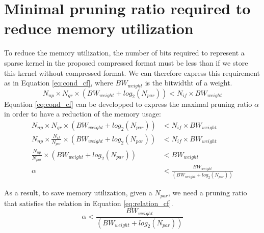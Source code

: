 \chapter{Minimal pruning ratio required to reduce memory utilization} \label{appendix:cf}
%
To reduce the memory utilization, the number of bits required to represent a sparse kernel in the proposed compressed format must be less than if we store this kernel without compressed format. We can therefore express this requirement as in Equation \eqref{eq:cond_cf}, where $BW_{weight}$ is the bitwidtht of a weight.
\begin{equation}
    N_{np} \times N_{gr} \times (BW_{weight} + log_2(N_{par})) < N_{if} \times BW_{weight}
    \label{eq:cond_cf}
\end{equation}
Equation \eqref{eq:cond_cf} can be developped to express the maximal pruning ratio $\alpha$ in order to have a reduction of the memory usage:
\begin{align*}
    N_{np} \times N_{gr} \times (BW_{weight} + log_2(N_{par})) &< N_{if} \times BW_{weight} \\
    N_{np} \times \frac{N_{if}}{N_{par}} \times (BW_{weight} + log_2(N_{par})) &< N_{if} \times BW_{weight} \\
    \frac{N_{np}}{N_{par}} \times (BW_{weight} + log_2(N_{par})) &< BW_{weight} \\
    \alpha &< \frac{BW_{weight}}{(BW_{weight} + log_2(N_{par}))}
\end{align*}

As a result, to save memory utilization, given a $N_{par}$, we need a pruning ratio that satisfies the relation in Equation \ref{eq:relation_cf}.
\begin{equation}
    \alpha < \frac{BW_{weight}}{(BW_{weight} + log_2(N_{par}))}
    \label{eq:relation_cf}
\end{equation} 
\newpage